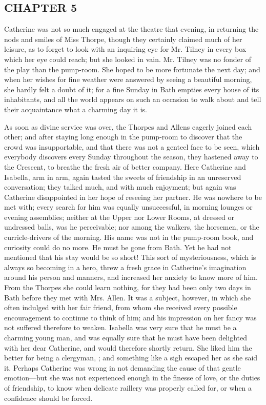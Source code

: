 \subsection[chapter-5]{\useURL[url7][][][]\from[url7]CHAPTER 5}

Catherine was not so much engaged at the theatre that evening, in returning the nods and smiles of Miss Thorpe, though they certainly claimed much of her leisure, as to forget to look with an inquiring eye for Mr. Tilney in every box which her eye could reach; but she looked in vain. Mr. Tilney was no fonder of the play than the pump-room. She hoped to be more fortunate the next day; and when her wishes for fine weather were answered by seeing a beautiful morning, she hardly felt a doubt of it; for a fine Sunday in Bath empties every house of its inhabitants, and all the world appears on such an occasion to walk about and tell their acquaintance what a charming day it is.

As soon as divine service was over, the Thorpes and Allens eagerly joined each other; and after staying long enough in the pump-room to discover that the crowd was insupportable, and that there was not a genteel face to be seen, which everybody discovers every Sunday throughout the season, they hastened away to the Crescent, to breathe the fresh air of better company. Here Catherine and Isabella, arm in arm, again tasted the sweets of friendship in an unreserved conversation; they talked much, and with much enjoyment; but again was Catherine disappointed in her hope of reseeing her partner. He was nowhere to be met with; every search for him was equally unsuccessful, in morning lounges or evening assemblies; neither at the Upper nor Lower Rooms, at dressed or undressed balls, was he perceivable; nor among the walkers, the horsemen, or the curricle-drivers of the morning. His name was not in the pump-room book, and curiosity could do no more. He must be gone from Bath. Yet he had not mentioned that his stay would be so short! This sort of mysteriousness, which is always so becoming in a hero, threw a fresh grace in Catherine's imagination around his person and manners, and increased her anxiety to know more of him. From the Thorpes she could learn nothing, for they had been only two days in Bath before they met with Mrs. Allen. It was a subject, however, in which she often indulged with her fair friend, from whom she received every possible encouragement to continue to think of him; and his impression on her fancy was not suffered therefore to weaken. Isabella was very sure that he must be a charming young man, and was equally sure that he must have been delighted with her dear Catherine, and would therefore shortly return. She liked him the better for being a clergyman, ; and something like a sigh escaped her as she said it. Perhaps Catherine was wrong in not demanding the cause of that gentle emotion---but she was not experienced enough in the finesse of love, or the duties of friendship, to know when delicate raillery was properly called for, or when a confidence should be forced.

